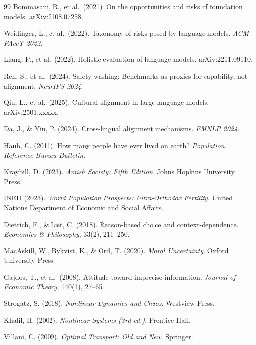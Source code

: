 \documentclass[11pt,a4paper]{article}
\theoremstyle{definition}
\theoremstyle{remark}
\begin{document}
\begin{thebibliography}{99}
Bommasani, R., et al.\ (2021).
On the opportunities and risks of foundation models.
arXiv:2108.07258.

Weidinger, L., et al.\ (2022).
Taxonomy of risks posed by language models.
\textit{ACM FAccT 2022}.

Liang, P., et al.\ (2022).
Holistic evaluation of language models.
arXiv:2211.09110.

Ren, S., et al.\ (2024).
Safety-washing: Benchmarks as proxies for capability,
not alignment.
\textit{NeurIPS 2024}.

Qiu, L., et al.\ (2025).
Cultural alignment in large language models.
arXiv:2501.xxxxx.

Da, J., \& Yin, P. (2024).
Cross-lingual alignment mechanisms.
\textit{EMNLP 2024}.

Haub, C. (2011).
How many people have ever lived on earth?
\textit{Population Reference Bureau Bulletin}.

Kraybill, D. (2023).
\textit{Amish Society: Fifth Edition}.
Johns Hopkins University Press.

INED (2023).
\textit{World Population Prospects: Ultra-Orthodox Fertility}.
United Nations Department of Economic and Social Affairs.

Dietrich, F., \& List, C. (2018).
Reason-based choice and context-dependence.
\textit{Economics \& Philosophy}, 33(2), 211--250.

MacAskill, W., Bykvist, K., \& Ord, T. (2020).
\textit{Moral Uncertainty}.
Oxford University Press.

Gajdos, T., et al.\ (2008).
Attitude toward imprecise information.
\textit{Journal of Economic Theory}, 140(1), 27--65.

Strogatz, S. (2018).
\textit{Nonlinear Dynamics and Chaos}.
Westview Press.

Khalil, H. (2002).
\textit{Nonlinear Systems (3rd ed.)}.
Prentice Hall.

Villani, C. (2009).
\textit{Optimal Transport: Old and New}.
Springer.


\end{thebibliography}
\end{document}

